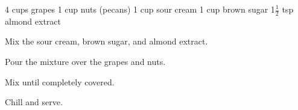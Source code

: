 \dishtype{}
\begin{ingreds}
    4 cups grapes
    1 cup nuts (pecans)
    1 cup sour cream
    1 cup brown sugar
    1$\frac{1}{2}$ tsp almond extract
\end{ingreds}
\begin{method}
    Mix the sour cream, brown sugar, and almond extract.\par
    Pour the mixture over the grapes and nuts.\par
    Mix until completely covered.\par
    Chill and serve.
\end{method}